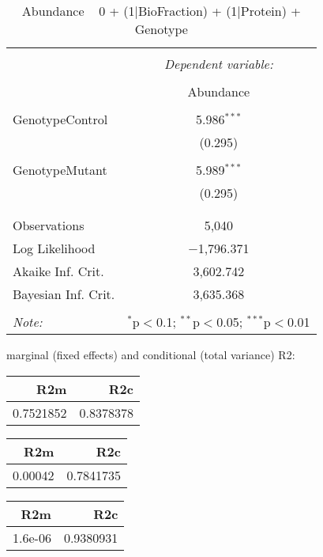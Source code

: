 \documentclass[11pt]{report}
\begin{document}
\begin{table}[!htbp] \centering 
  \caption{Abundance ~ 0 + (1|BioFraction) + (1|Protein) + Genotype} 
  \label{} 
\begin{tabular}{@{\extracolsep{5pt}}lc} 
\\[-1.8ex]\hline 
\hline \\[-1.8ex] 
 & \multicolumn{1}{c}{\textit{Dependent variable:}} \\ 
\cline{2-2} 
\\[-1.8ex] & Abundance \\ 
\hline \\[-1.8ex] 
 GenotypeControl & 5.986$^{***}$ \\ 
  & (0.295) \\ 
  & \\ 
 GenotypeMutant & 5.989$^{***}$ \\ 
  & (0.295) \\ 
  & \\ 
\hline \\[-1.8ex] 
Observations & 5,040 \\ 
Log Likelihood & $-$1,796.371 \\ 
Akaike Inf. Crit. & 3,602.742 \\ 
Bayesian Inf. Crit. & 3,635.368 \\ 
\hline 
\hline \\[-1.8ex] 
\textit{Note:}  & \multicolumn{1}{r}{$^{*}$p$<$0.1; $^{**}$p$<$0.05; $^{***}$p$<$0.01} \\ 
\end{tabular} 
\end{table} 
marginal (fixed effects) and conditional (total variance) R2:

\begin{tabular}{r|r}
\hline
R2m & R2c\\
\hline
0.7521852 & 0.8378378\\
\hline
\end{tabular}

\begin{tabular}{r|r}
\hline
R2m & R2c\\
\hline
0.00042 & 0.7841735\\
\hline
\end{tabular}

\begin{tabular}{r|r}
\hline
R2m & R2c\\
\hline
1.6e-06 & 0.9380931\\
\hline
\end{tabular}
\end{document}
